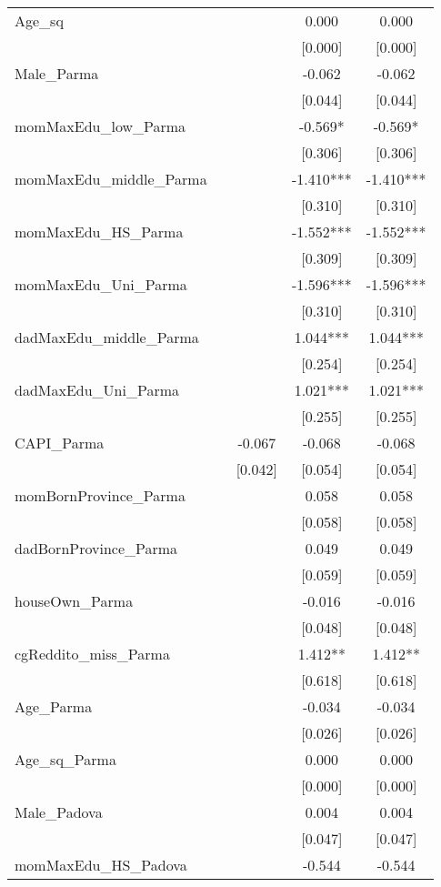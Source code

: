 \documentclass[]{article}
\begin{document}
\begin{tabular}{lcccc}
Age\_sq &  &  & 0.000 & 0.000 \\
 &  &  & [0.000] & [0.000] \\
Male\_Parma &  &  & -0.062 & -0.062 \\
 &  &  & [0.044] & [0.044] \\
momMaxEdu\_low\_Parma &  &  & -0.569* & -0.569* \\
 &  &  & [0.306] & [0.306] \\
momMaxEdu\_middle\_Parma &  &  & -1.410*** & -1.410*** \\
 &  &  & [0.310] & [0.310] \\
momMaxEdu\_HS\_Parma &  &  & -1.552*** & -1.552*** \\
 &  &  & [0.309] & [0.309] \\
momMaxEdu\_Uni\_Parma &  &  & -1.596*** & -1.596*** \\
 &  &  & [0.310] & [0.310] \\
dadMaxEdu\_middle\_Parma &  &  & 1.044*** & 1.044*** \\
 &  &  & [0.254] & [0.254] \\
dadMaxEdu\_Uni\_Parma &  &  & 1.021*** & 1.021*** \\
 &  &  & [0.255] & [0.255] \\
CAPI\_Parma &  & -0.067 & -0.068 & -0.068 \\
 &  & [0.042] & [0.054] & [0.054] \\
momBornProvince\_Parma &  &  & 0.058 & 0.058 \\
 &  &  & [0.058] & [0.058] \\
dadBornProvince\_Parma &  &  & 0.049 & 0.049 \\
 &  &  & [0.059] & [0.059] \\
houseOwn\_Parma &  &  & -0.016 & -0.016 \\
 &  &  & [0.048] & [0.048] \\
cgReddito\_miss\_Parma &  &  & 1.412** & 1.412** \\
 &  &  & [0.618] & [0.618] \\
Age\_Parma &  &  & -0.034 & -0.034 \\
 &  &  & [0.026] & [0.026] \\
Age\_sq\_Parma &  &  & 0.000 & 0.000 \\
 &  &  & [0.000] & [0.000] \\
Male\_Padova &  &  & 0.004 & 0.004 \\
 &  &  & [0.047] & [0.047] \\
momMaxEdu\_HS\_Padova &  &  & -0.544 & -0.544 \\

\end{tabular}
\end{document}
